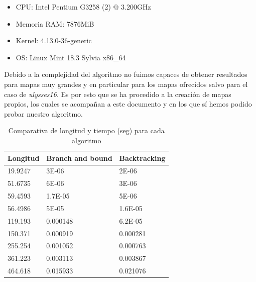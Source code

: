 \documentclass{article}
\begin{document}
\begin{itemize}
\item CPU: Intel Pentium G3258 (2) @ 3.200GHz
\item Memoria RAM: 7876MiB
\item Kernel: 4.13.0-36-generic
\item OS: Linux Mint 18.3 Sylvia x86\_64
\end{itemize}

Debido a la complejidad del algoritmo no fuimos capaces de obtener
resultados para mapas muy grandes y en particular para los mapas
ofrecidos salvo para el caso de \textit{ulysses16}. Es por esto que se
ha procedido a la creación de mapas propios, los cuales se acompañan a
este documento y en los que sí hemos podido probar nuestro algoritmo.

\begin{table}[H]
\centering
\caption{Comparativa de longitud y tiempo (seg) para cada algoritmo}
\label{my-label}
\begin{tabular}{lll}
\hline
\multicolumn{1}{|l|}{Longitud} & \multicolumn{1}{l|}{Branch and bound} & \multicolumn{1}{l|}{Backtracking} \\ \hline
\multicolumn{1}{|l|}{19.9247}  & \multicolumn{1}{l|}{3E-06}            & \multicolumn{1}{l|}{2E-06}        \\ \hline
\multicolumn{1}{|l|}{51.6735}  & \multicolumn{1}{l|}{6E-06}            & \multicolumn{1}{l|}{3E-06}        \\ \hline
\multicolumn{1}{|l|}{59.4593}  & \multicolumn{1}{l|}{1.7E-05}          & \multicolumn{1}{l|}{5E-06}        \\ \hline
\multicolumn{1}{|l|}{56.4986}  & \multicolumn{1}{l|}{5E-05}            & \multicolumn{1}{l|}{1.6E-05}      \\ \hline
\multicolumn{1}{|l|}{119.193}  & \multicolumn{1}{l|}{0.000148}         & \multicolumn{1}{l|}{6.2E-05}      \\ \hline
\multicolumn{1}{|l|}{150.371}  & \multicolumn{1}{l|}{0.000919}         & \multicolumn{1}{l|}{0.000281}     \\ \hline
\multicolumn{1}{|l|}{255.254}  & \multicolumn{1}{l|}{0.001052}         & \multicolumn{1}{l|}{0.000763}     \\ \hline
\multicolumn{1}{|l|}{361.223}  & \multicolumn{1}{l|}{0.003113}         & \multicolumn{1}{l|}{0.003867}     \\ \hline
\multicolumn{1}{|l|}{464.618}  & \multicolumn{1}{l|}{0.015933}         & \multicolumn{1}{l|}{0.021076}     \\ \hline

\end{tabular}
\end{table}
\end{document}
